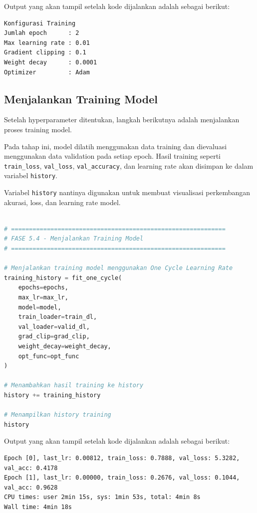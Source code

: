 Output yang akan tampil setelah kode dijalankan adalah sebagai berikut:

\begin{outputcode}[H]
\begin{lstlisting}[language={}]
Konfigurasi Training
Jumlah epoch      : 2
Max learning rate : 0.01
Gradient clipping : 0.1
Weight decay      : 0.0001
Optimizer         : Adam
\end{lstlisting}
\caption{Output konfigurasi hyperparameter}
\end{outputcode}

\subsection{Menjalankan Training Model}

Setelah hyperparameter ditentukan, langkah berikutnya adalah menjalankan proses training model.

Pada tahap ini, model dilatih menggunakan data training dan dievaluasi menggunakan data validation pada setiap epoch. Hasil training seperti \texttt{train\_loss}, \texttt{val\_loss}, \texttt{val\_accuracy}, dan learning rate akan disimpan ke dalam variabel \texttt{history}.

Variabel \texttt{history} nantinya digunakan untuk membuat visualisasi perkembangan akurasi, loss, dan learning rate model.

\begin{lstlisting}[language=Python, caption=Menjalankan training model]
%%time

# ============================================================
# FASE 5.4 - Menjalankan Training Model
# ============================================================

# Menjalankan training model menggunakan One Cycle Learning Rate
training_history = fit_one_cycle(
    epochs=epochs,
    max_lr=max_lr,
    model=model,
    train_loader=train_dl,
    val_loader=valid_dl,
    grad_clip=grad_clip,
    weight_decay=weight_decay,
    opt_func=opt_func
)

# Menambahkan hasil training ke history
history += training_history

# Menampilkan history training
history
\end{lstlisting}

Output yang akan tampil setelah kode dijalankan adalah sebagai berikut:

\begin{outputcode}[H]
\begin{lstlisting}[language={}]
Epoch [0], last_lr: 0.00812, train_loss: 0.7888, val_loss: 5.3282, val_acc: 0.4178
Epoch [1], last_lr: 0.00000, train_loss: 0.2676, val_loss: 0.1044, val_acc: 0.9628
CPU times: user 2min 15s, sys: 1min 53s, total: 4min 8s
Wall time: 4min 18s
\end{lstlisting}
\caption{Output proses training model}
\end{outputcode}

